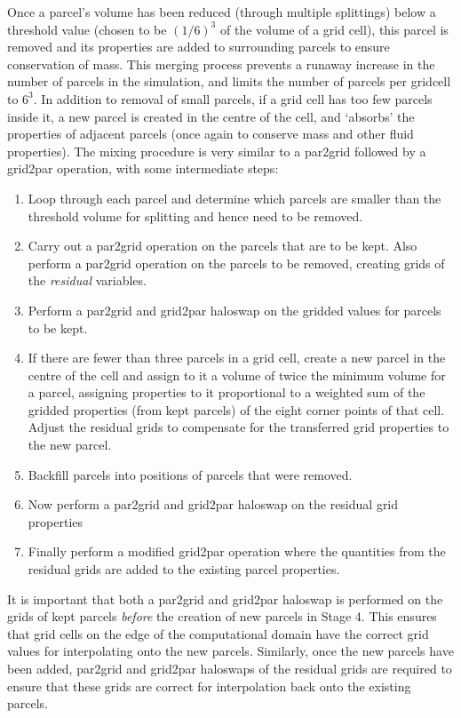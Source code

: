 \documentclass{article}
\begin{document}
Once a parcel's volume has been reduced (through multiple splittings) below a threshold value (chosen to be $(1/6)^3$ of the volume of a grid cell), this parcel is removed and its properties are added to surrounding parcels to ensure conservation of mass. This merging process prevents a runaway increase in the number of parcels in the simulation, and limits the number of parcels per gridcell to $6^3$. In addition to removal of small parcels, if a grid cell has too few parcels inside it, a new parcel is created in the centre of the cell, and `absorbs' the properties of adjacent parcels (once again to conserve mass and other fluid properties). The mixing procedure is very similar to a par2grid followed by a grid2par operation, with some intermediate steps:
\begin{enumerate}
  \item Loop through each parcel and determine which parcels are smaller than the threshold volume for splitting and hence need to be removed.
  \item Carry out a par2grid operation on the parcels that are to be kept. Also perform a par2grid operation on the parcels to be removed, creating grids of the \emph{residual} variables.
  \item Perform a par2grid and grid2par haloswap on the gridded values for parcels to be kept.
  \item If there are fewer than three parcels in a grid cell, create a new parcel in the centre of the cell and assign to it a volume of twice the minimum volume for a parcel, assigning properties to it proportional to a weighted sum of the gridded properties (from kept parcels) of the eight corner points of that cell. Adjust the residual grids to compensate for the transferred grid properties to the new parcel.
  \item Backfill parcels into positions of parcels that were removed.
  \item Now perform a par2grid and grid2par haloswap on the residual grid properties
  \item Finally perform a modified grid2par operation where the quantities from the residual grids are added to the existing parcel properties.
\end{enumerate}
It is important that both a par2grid and grid2par haloswap is performed on the grids of kept parcels \emph{before} the creation of new parcels in Stage 4. This ensures that grid cells on the edge of the computational domain have the correct grid values for interpolating onto the new parcels. Similarly, once the new parcels have been added, par2grid and grid2par haloswaps of the residual grids are required to ensure that these grids are correct for interpolation back onto the existing parcels.
\end{document}
